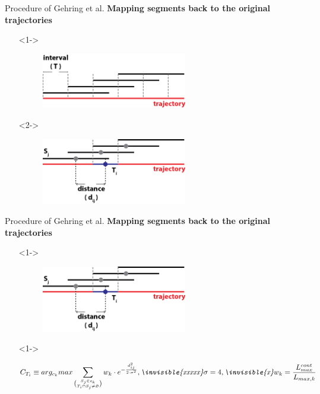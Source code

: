 \documentclass{beamer}
\begin{document}
{\begin{frame}{Procedure of Gehring et al.}
	\textbf{Mapping segments back to the original trajectories}	
	\vspace{5mm}	
	\begin{itemize}[leftmargin=-2mm]
		\setlength\itemsep{2.3em}
		\item[]<1-> 	
		\begin{figure}[H]
			\centering
			\includegraphics[width=0.6\textwidth]{figures/intervals1}
		\end{figure}
		\item[]<2-> 
		\begin{figure}[H]
			\centering
			\includegraphics[width=0.6\textwidth]{figures/intervals2}
		\end{figure}
	\end{itemize}
\end{frame}	
\begin{frame}{Procedure of Gehring et al.}
	\textbf{Mapping segments back to the original trajectories}	
	\vspace{6mm}	
	\begin{itemize}[leftmargin=-2mm]
		\setlength\itemsep{2.3em}
		\item[]<1-> 	
		\begin{figure}[H]
			\centering
			\includegraphics[width=0.6\textwidth]{figures/intervals2}
		\end{figure}
		\item[]<1-> 
		\begin{large}	
			\begin{equation*}
				C_{T_i} \equiv arg_{c_k}max\sum_{\binom{S_j \in c_k}{T_i\cap S_j\neq\varnothing}} w_k \cdot e^{-\frac{d_{ij}^2}{2 \cdot \sigma^2}},
				\textit{\invisible{xxxxx}}\sigma = 4, \textit{\invisible{x}} w_k = \frac{L_{max}^{cont}}{L_{max,k}}
			\end{equation*}	
		\end{large}
	\end{itemize}
\end{frame}	

}
\end{document}
